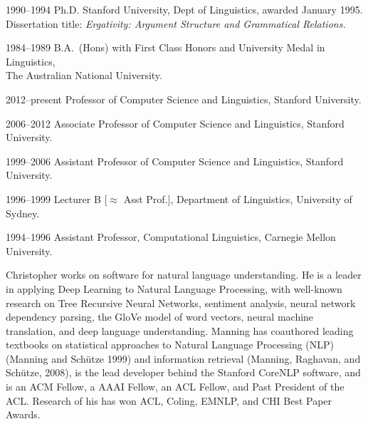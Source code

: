 \documentclass[11pt]{article}
\begin{document}
\begin{vita}
\begin{Professional Preparation}[1990--1994]
\item[1990--1994] Ph.D. Stanford University, Dept of
Linguistics, awarded January 1995.
Dissertation title: {\em Ergativity: Argument Structure and Grammatical
Relations.}
\item[1984--1989] B.A.\ (Hons) with First Class Honors and University
Medal in Linguistics,\\
The Australian National University.
\end{Professional Preparation}

\begin{Appointments}[1996--present]
\item[2012--present] Professor of Computer Science and Linguistics,
  Stanford University.
\item[2006--2012] Associate Professor of Computer Science and
Linguistics, Stanford University.
\item[1999--2006] Assistant Professor of Computer Science and
Linguistics, Stanford University.
\item[1996--1999] Lecturer B [$\approx$ Asst Prof.], %
Department of Linguistics, University of Sydney. 
\item[1994--1996] Assistant Professor,
Computational Linguistics,
Carnegie Mellon University.
\end{Appointments}

\begin{Synopsis}
\item
Christopher works on software for natural language understanding.
 He is a leader in
applying Deep Learning to Natural Language Processing, with well-known
research on Tree Recursive Neural Networks, sentiment analysis, neural
network dependency parsing, the GloVe model of word vectors, neural
machine translation, and deep language understanding. Manning has
coauthored leading textbooks on statistical approaches to Natural
Language Processing (NLP) (Manning and Sch\"utze 1999) and information
retrieval (Manning, Raghavan, and Sch\"utze, 2008), is the lead
developer behind the Stanford CoreNLP software, and is an ACM Fellow,
a AAAI Fellow, an ACL Fellow, and Past President of the
ACL\@. Research of his has won ACL, Coling, EMNLP, and CHI Best Paper
Awards. 
\end{Synopsis}


\end{vita}
\end{document}
